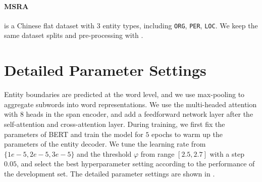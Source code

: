 \documentclass[11pt]{article}
\begin{document}
\paragraph{MSRA} \citep{levow-2006-third} is a Chinese flat dataset with 3 entity types, including \texttt{ORG}, \texttt{PER}, \texttt{LOC}. We keep the same dataset splits and pre-processing with \citet{li2022unified, shen-etal-2021-locate}.




\section{Detailed Parameter Settings}
\label{app:settings}

Entity boundaries are predicted at the word level, and we use max-pooling to aggregate subwords into word representations. We use the multi-headed attention with 8 heads in the span encoder, and add a feedforward network layer after the self-attention and cross-attention layer. During training, we first fix the parameters of BERT and train the model for $5$ epochs to warm up the parameters of the entity decoder. We tune the learning rate from $\{1e-5, 2e-5, 3e-5\}$ and the threshold $\varphi$ from range $[2.5, 2.7]$ with a step $0.05$, and select the best hyperparameter setting according to the performance of the development set. The detailed parameter settings are shown in .
\end{document}
